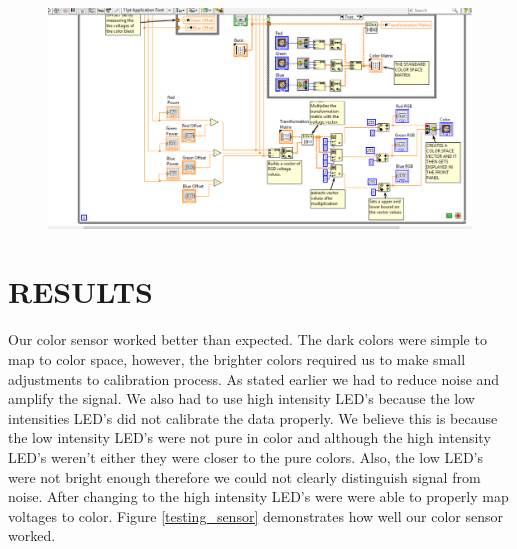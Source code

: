 \documentclass[paper=letter, fontsize=12pt]{article}
\begin{document}
 	
\begin{figure}[H]
\centering
\includegraphics[scale=.4]{backpanel2.png}
\caption{}
\label{backpanel2}
\end{figure}

\section*{RESULTS}

Our color sensor worked better than expected. The dark colors were simple to map to color space, however, the brighter colors required us to make small adjustments to calibration process. As stated earlier we had to reduce noise and amplify the signal. We also had to use high intensity LED's because the low intensities LED's did not calibrate the data properly. We believe this is because the low intensity LED's were not pure in color and although the high intensity LED's weren't either they were closer to the pure colors. Also, the low LED's were not bright enough therefore we could not clearly distinguish signal from noise. After changing to the high intensity LED's were were able to properly map voltages to color. Figure \ref*{testing_sensor} demonstrates how well our color sensor worked.
\end{document}
